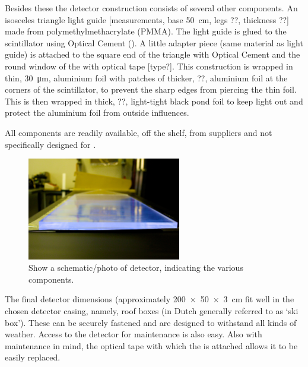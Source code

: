 Besides these the detector construction consists of several other components. An isosceles triangle light guide [measurements, base \SI{50}{\centi\meter}, legs ??, thickness ??] made from polymethylmethacrylate (PMMA). The light guide is glued to the scintillator using Optical Cement (\cite{bc600}). A little adapter piece (same material as light guide) is attached to the square end of the triangle with Optical Cement and the round window of the \pmt with optical tape [type?]. This construction is wrapped in thin, \SI{30}{\micro\meter}, aluminium foil with patches of thicker, ??, aluminium foil at the corners of the scintillator, to prevent the sharp edges from piercing the thin foil. This is then wrapped in thick, ??, light-tight black pond foil to keep light out and protect the aluminium foil from outside influences.

All components are readily available, off the shelf, from suppliers and not specifically designed for \hisparc.

\begin{figure}
    \centering
    \includegraphics[width=0.6\textwidth]
                    {plots/experiment/ADL_115651.jpg}
    \caption{Show a schematic/photo of detector, indicating the various components.}
    \label{fig:schematic_detector}
\end{figure}

The final detector dimensions (approximately \SI[product-units=power]{200 x 50 x 3}{\centi\meter} fit well in the chosen detector casing, namely, roof boxes (in Dutch generally referred to as `ski box'). These can be securely fastened and are designed to withstand all kinds of weather. Access to the detector for maintenance is also easy. Also with maintenance in mind, the optical tape with which the \pmt is attached allows it to be easily replaced.

